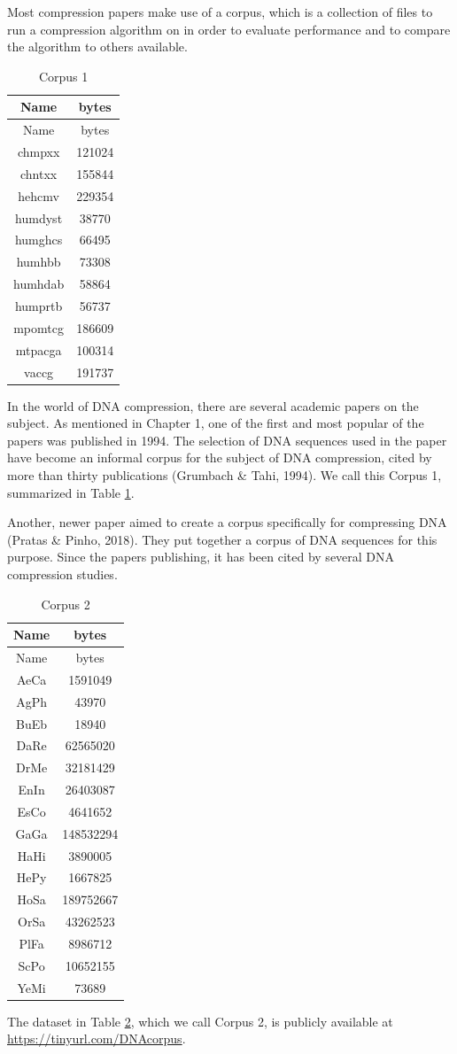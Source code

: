 \documentclass[12pt,twoside]{reedthesis}
\begin{document}
Most compression papers make use of a corpus, which is a collection of files to run a compression algorithm on in order to evaluate performance and to compare the algorithm to others available.
\begin{longtable}[]{@{}cc@{}}
\caption{\label{tab:corpus1filesfig}Corpus 1}\tabularnewline
\toprule()
Name & bytes \\
\midrule()
\endfirsthead
\toprule()
Name & bytes \\
\midrule()
\endhead
chmpxx & 121024 \\
chntxx & 155844 \\
hehcmv & 229354 \\
humdyst & 38770 \\
humghcs & 66495 \\
humhbb & 73308 \\
humhdab & 58864 \\
humprtb & 56737 \\
mpomtcg & 186609 \\
mtpacga & 100314 \\
vaccg & 191737 \\
\bottomrule()
\end{longtable}
In the world of DNA compression, there are several academic papers on the subject. As mentioned in Chapter 1, one of the first and most popular of the papers was published in 1994. The selection of DNA sequences used in the paper have become an informal corpus for the subject of DNA compression, cited by more than thirty publications (Grumbach \& Tahi, 1994). We call this Corpus 1, summarized in Table \ref{tab:corpus1filesfig}.

Another, newer paper aimed to create a corpus specifically for compressing DNA (Pratas \& Pinho, 2018). They put together a corpus of DNA sequences for this purpose. Since the papers publishing, it has been cited by several DNA compression studies.
\begin{longtable}[]{@{}cc@{}}
\caption{\label{tab:corpus2filesfig}Corpus 2}\tabularnewline
\toprule()
Name & bytes \\
\midrule()
\endfirsthead
\toprule()
Name & bytes \\
\midrule()
\endhead
AeCa & 1591049 \\
AgPh & 43970 \\
BuEb & 18940 \\
DaRe & 62565020 \\
DrMe & 32181429 \\
EnIn & 26403087 \\
EsCo & 4641652 \\
GaGa & 148532294 \\
HaHi & 3890005 \\
HePy & 1667825 \\
HoSa & 189752667 \\
OrSa & 43262523 \\
PlFa & 8986712 \\
ScPo & 10652155 \\
YeMi & 73689 \\
\bottomrule()
\end{longtable}
The dataset in Table \ref{tab:corpus2filesfig}, which we call Corpus 2, is publicly available at \url{https://tinyurl.com/DNAcorpus}.
\end{document}
